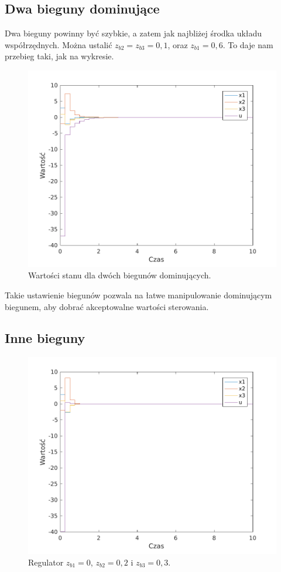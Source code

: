 \subsection{Dwa bieguny dominujące}
Dwa bieguny powinny być szybkie, a zatem jak najbliżej środka układu współrzędnych.
Można ustalić $z_{b2} = z_{b3} = 0,1$, oraz $z_{b1} = 0,6$.
To daje nam przebieg taki, jak na wykresie.
\begin{figure}[H]
\centering
 \includegraphics[width=\textwidth]{img/plot2.pdf}
\caption{Wartości stanu dla dwóch biegunów dominujących.}
\end{figure}
Takie ustawienie biegunów pozwala na łatwe manipulowanie dominującym biegunem, aby dobrać akceptowalne wartości sterowania.

\subsection{Inne bieguny}

\begin{figure}[H]
\centering
 \includegraphics[width=\textwidth]{img/plot3.pdf}
\caption{Regulator $z_{b1}=0$, $z_{b2}=0,2$ i $z_{b3}=0,3$.}
\end{figure}

